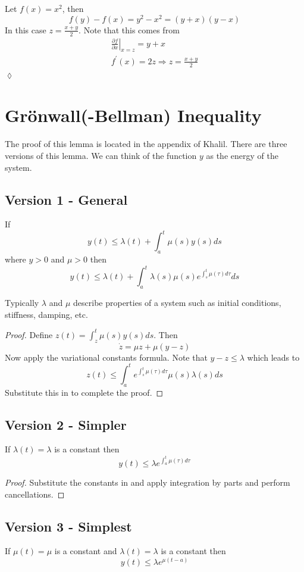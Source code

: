 \begin{example}
Let $f(x) = x^2$, then
$$f(y) - f(x) = y^2 - x^2 = (y+x)(y-x)$$
In this case $z=\frac{x+y}{2}$. Note that this comes from
\begin{align*}
\left.\frac{\partial f}{\partial x}\right|_{x=z} = y+x \\
f^\prime(x) = 2z \Rightarrow z = \frac{x+y}{2}
\end{align*}
$\lozenge$
\end{example}

\section{Gr\"onwall(-Bellman) Inequality}
\label{sec:04gronwall}
The proof of this lemma is located in the appendix of Khalil. There are three versions of this lemma. We can think of the function $y$ as the energy of the system.

\subsection{Version 1 - General}
\begin{lemma}
If
$$y(t) \leq \lambda(t) + \int_a^t\mu(s)y(s)ds$$
where $y>0$ and $\mu>0$ then
$$y(t) \leq \lambda(t) + \int_a^t \lambda(s)\mu(s) e^{\int_s^t\mu(\tau)d\tau}ds$$
\end{lemma}
Typically $\lambda$ and $\mu$ describe properties of a system such as initial conditions, stiffness, damping, etc.

\begin{proof}
Define $z(t) = \int_z^t \mu(s)y(s)ds$. Then
$$\dot{z} = \mu z + \mu(y-z)$$
Now apply the variational constants formula. Note that $y-z\leq\lambda$ which leads to
$$z(t) \leq \int_a^t e^{\int_s^t \mu(\tau)d\tau}\mu(s)\lambda(s)ds$$
Substitute this in to complete the proof.
\end{proof}

\subsection{Version 2 - Simpler}
\begin{lemma}
If $\lambda(t) = \lambda$ is a constant then
$$y(t) \leq \lambda e^{\int_a^t \mu(\tau)d\tau}$$
\end{lemma}

\begin{proof}
Substitute the constants in and apply integration by parts and perform cancellations.
\end{proof}

\subsection{Version 3 - Simplest}
\begin{lemma}
If $\mu(t) = \mu$ is a constant and $\lambda(t) = \lambda$ is a constant then
$$y(t) \leq \lambda e^{\mu(t-a)}$$
\end{lemma}
